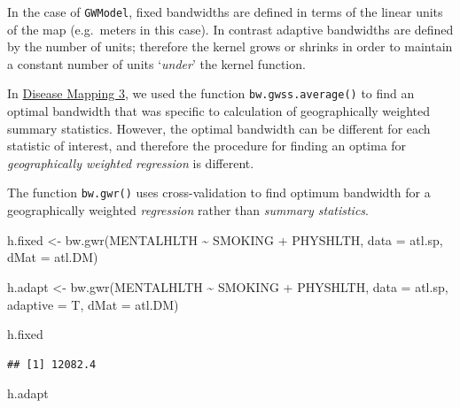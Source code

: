 \documentclass[
]{book}
\newenvironment{Shaded}{\begin{snugshade}}{\end{snugshade}}
\newcommand{\AttributeTok}[1]{\textcolor[rgb]{0.77,0.63,0.00}{#1}}
\newcommand{\FunctionTok}[1]{\textcolor[rgb]{0.00,0.00,0.00}{#1}}
\newcommand{\NormalTok}[1]{#1}
\newcommand{\OtherTok}[1]{\textcolor[rgb]{0.56,0.35,0.01}{#1}}
\newcommand{\SpecialCharTok}[1]{\textcolor[rgb]{0.00,0.00,0.00}{#1}}
\begin{document}
In the case of \texttt{GWModel}, fixed bandwidths are defined in terms of the linear units of the map (e.g.~meters in this case). In contrast adaptive bandwidths are defined by the number of units; therefore the kernel grows or shrinks in order to maintain a constant number of units `\emph{under}' the kernel function.

In \protect\hyperlink{gwss}{Disease Mapping 3}, we used the function \texttt{bw.gwss.average()} to find an optimal bandwidth that was specific to calculation of geographically weighted summary statistics. However, the optimal bandwidth can be different for each statistic of interest, and therefore the procedure for finding an optima for \emph{geographically weighted regression} is different.

The function \texttt{bw.gwr()} uses cross-validation to find optimum bandwidth for a geographically weighted \emph{regression} rather than \emph{summary statistics}.

\begin{Shaded}
\begin{Highlighting}[]
\NormalTok{h.fixed }\OtherTok{\textless{}{-}} \FunctionTok{bw.gwr}\NormalTok{(MENTALHLTH }\SpecialCharTok{\textasciitilde{}}\NormalTok{ SMOKING }\SpecialCharTok{+}\NormalTok{ PHYSHLTH, }
             \AttributeTok{data =}\NormalTok{ atl.sp, }
             \AttributeTok{dMat =}\NormalTok{ atl.DM)}

\NormalTok{h.adapt }\OtherTok{\textless{}{-}} \FunctionTok{bw.gwr}\NormalTok{(MENTALHLTH }\SpecialCharTok{\textasciitilde{}}\NormalTok{ SMOKING }\SpecialCharTok{+}\NormalTok{ PHYSHLTH, }
             \AttributeTok{data =}\NormalTok{ atl.sp, }
             \AttributeTok{adaptive =}\NormalTok{ T,}
             \AttributeTok{dMat =}\NormalTok{ atl.DM)}
\end{Highlighting}
\end{Shaded}

\begin{Shaded}
\begin{Highlighting}[]
\NormalTok{h.fixed}
\end{Highlighting}
\end{Shaded}

\begin{verbatim}
## [1] 12082.4
\end{verbatim}

\begin{Shaded}
\begin{Highlighting}[]
\NormalTok{h.adapt}
\end{Highlighting}
\end{Shaded}
\end{document}

